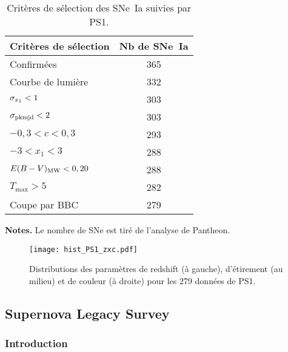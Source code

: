 \documentclass[../main/main.tex]{subfiles}
\begin{document}
\begin{table}[]
    \centering
    \begin{threeparttable}
        \caption{Critères de sélection des SNe~Ia suivies par PS1.}
        \label{tab:ps1cuts}
        \begin{tabular}{lc}
            \toprule
            Critères de sélection     & Nb de SNe~Ia \\
            \midrule
            Confirmées                & 365 \\
            Courbe de lumière         & 332 \\
            $\sigma_{x_1} < 1$            & 303 \\
            $\sigma_{\rm pkmjd} < 2$      & 303 \\
            $-0,3 < c < 0,3$          & 293 \\
            $-3 < x_1 < 3$            & 288 \\
            $E(B-V)_{\rm MW} < 0,20 $ & 288 \\
            $T_{\max} > 5$            & 282 \\
            \midrule
            Coupe par BBC             & 279 \\
            \bottomrule
        \end{tabular}
        \begin{tablenotes}[flushleft]
        \item \textbf{\hspace{-3,2pt}Notes.} Le nombre de SNe est tiré de
            l'analyse de Pantheon.
        \end{tablenotes}
    \end{threeparttable}
\end{table}

\begin{figure}[ht]
    \centering
    \texttt{[image: hist\_PS1\_zxc.pdf]}
    \captionsetup{justification=centering}
    \caption{Distributions des paramètres de redshift (à gauche), d'étirement (au
    milieu) et de couleur (à droite) pour les 279 données de PS1.}
    \label{fig:ps1hist}
\end{figure}

\subsection{Supernova Legacy Survey}\label{ssec:snls}
\subsubsection{Introduction}\label{sssec:snlsintro}
\end{document}
